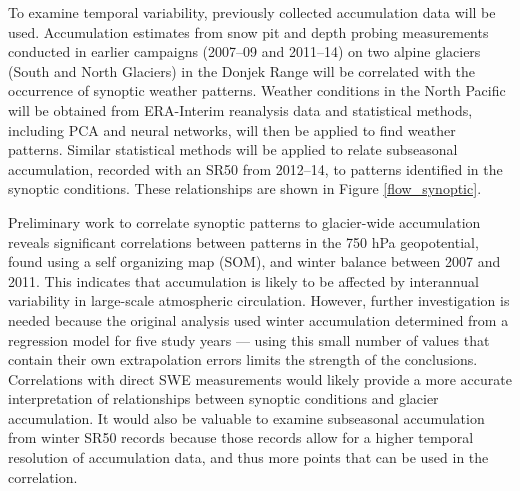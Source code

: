 \documentclass[12pt]{article}
\begin{document}
To examine temporal variability, previously collected accumulation data will be used. Accumulation estimates from snow pit and depth probing measurements conducted in earlier campaigns (2007--09 and 2011--14) on two alpine glaciers (South and North Glaciers) in the Donjek Range will be correlated with the occurrence of synoptic weather patterns. Weather conditions in the North Pacific will be obtained from ERA-Interim reanalysis data and statistical methods, including PCA and neural networks, will then be applied to find weather patterns. Similar statistical methods will be applied to relate subseasonal accumulation, recorded with an SR50 from 2012--14, to  patterns identified in the synoptic conditions. These relationships are shown in Figure \ref{flow_synoptic}. 

Preliminary work to correlate synoptic patterns to glacier-wide accumulation reveals significant correlations between patterns in the 750 hPa geopotential, found using a self organizing map (SOM), and winter balance between 2007 and 2011. This indicates that accumulation is likely to be affected by interannual variability in large-scale atmospheric circulation. However, further investigation is needed because the original analysis used winter accumulation determined from a regression model for five study years --- using this small number of values that contain their own extrapolation errors limits the strength of the conclusions. Correlations with direct SWE measurements would likely provide a more accurate interpretation of relationships between synoptic conditions and glacier accumulation. It would also be valuable to examine subseasonal accumulation from winter SR50 records because those records allow for a higher temporal resolution of accumulation data, and thus more points that can be used in the correlation. 
\end{document}
